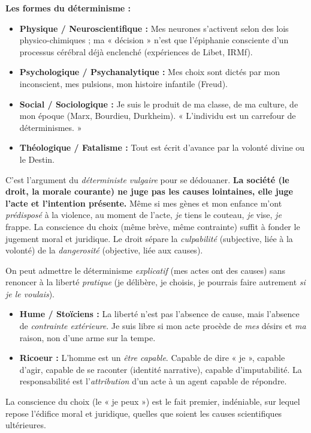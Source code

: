 \documentclass[11pt]{article}
\newcommand{\cle}[1]{{\popxbold\color{popdark}#1}}
\begin{document}
\textbf{Les formes du déterminisme :}
\begin{itemize}
    \item \textbf{Physique / Neuroscientifique :} Mes neurones s'activent selon des lois physico-chimiques ; ma « décision » n'est que l'épiphanie consciente d'un processus cérébral déjà enclenché (expériences de Libet, IRMf).
    \item \textbf{Psychologique / Psychanalytique :} Mes choix sont dictés par mon inconscient, mes pulsions, mon histoire infantile (Freud).
    \item \textbf{Social / Sociologique :} Je suis le produit de ma classe, de ma culture, de mon époque (Marx, Bourdieu, Durkheim). « L'individu est un carrefour de déterminismes. »
    \item \textbf{Théologique / Fatalisme :} Tout est écrit d'avance par la volonté divine ou le Destin.
\end{itemize}

\begin{attention}
C'est l'argument du \emph{déterministe vulgaire} pour se dédouaner. \textbf{La société (le droit, la morale courante) ne juge pas les causes lointaines, elle juge l'acte et l'intention présente.} Même si mes gènes et mon enfance m'ont \emph{prédisposé} à la violence, au moment de l'acte, \emph{je} tiens le couteau, \emph{je} vise, \emph{je} frappe. La \cle{conscience du choix} (même brève, même contrainte) suffit à fonder le jugement moral et juridique. Le droit sépare la \emph{culpabilité} (subjective, liée à la volonté) de la \emph{dangerosité} (objective, liée aux causes).
\end{attention}

\begin{propriete}
On peut admettre le déterminisme \emph{explicatif} (mes actes ont des causes) sans renoncer à la liberté \emph{pratique} (je délibère, je choisis, je pourrais faire autrement \emph{si je le voulais}).
\begin{itemize}
    \item \textbf{Hume / Stoïciens :} La liberté n'est pas l'absence de cause, mais l'absence de \emph{contrainte extérieure}. Je suis libre si mon acte procède de \emph{mes} désirs et \emph{ma} raison, non d'une arme sur la tempe.
    \item \textbf{Ricoeur :} L'homme est un \emph{être capable}. Capable de dire « je », capable d'agir, capable de se raconter (identité narrative), capable d'imputabilité. La responsabilité est l'\emph{attribution} d'un acte à un agent capable de répondre.
\end{itemize}
La \cle{conscience du choix} (le « je peux ») est le fait premier, indéniable, sur lequel repose l'édifice moral et juridique, quelles que soient les causes scientifiques ultérieures.
\end{propriete}
\end{document}
